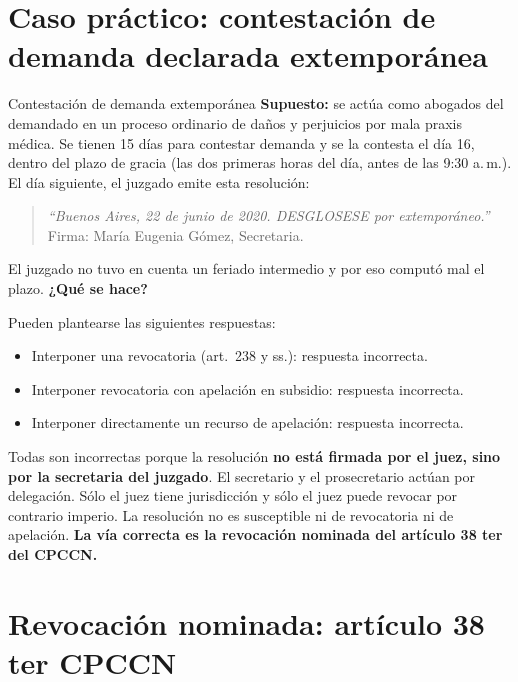 \documentclass[12pt,oneside]{book}
\begin{document}
\section{Caso práctico: contestación de demanda declarada extemporánea}

\begin{exercise}{Contestación de demanda extemporánea}
\textbf{Supuesto:} se actúa como abogados del demandado en un proceso ordinario de daños y perjuicios por mala praxis médica. Se tienen 15 días para contestar demanda y se la contesta el día 16, dentro del plazo de gracia (las dos primeras horas del día, antes de las 9:30 a.\,m.). El día siguiente, el juzgado emite esta resolución:

\begin{quote}
\textit{``Buenos Aires, 22 de junio de 2020. DESGLOSESE por extemporáneo.''} Firma: María Eugenia Gómez, Secretaria.
\end{quote}

El juzgado no tuvo en cuenta un feriado intermedio y por eso computó mal el plazo. \textbf{¿Qué se hace?}
\end{exercise}

Pueden plantearse las siguientes respuestas:

\begin{itemize}
    \item Interponer una revocatoria (art.~238 y ss.): respuesta incorrecta.
    \item Interponer revocatoria con apelación en subsidio: respuesta incorrecta.
    \item Interponer directamente un recurso de apelación: respuesta incorrecta.
\end{itemize}

\begin{important}
Todas son incorrectas porque la resolución \textbf{no está firmada por el juez, sino por la secretaria del juzgado}. El secretario y el prosecretario actúan por delegación. Sólo el juez tiene jurisdicción y sólo el juez puede revocar por contrario imperio. La resolución no es susceptible ni de revocatoria ni de apelación. \textbf{La vía correcta es la revocación nominada del artículo 38 ter del CPCCN.}
\end{important}

\section{Revocación nominada: artículo 38 ter CPCCN}
\end{document}
